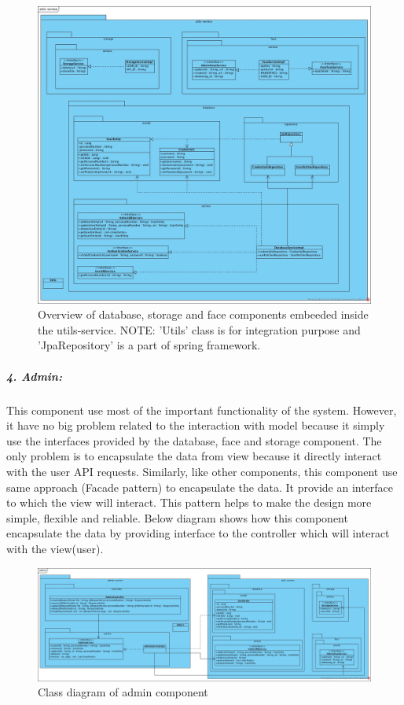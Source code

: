 \documentclass[a4paper,11pt]{article}
\begin{document}
\newpage
\begin{figure}[ht!]
 \centering
    \includegraphics[width=170mm]{ClassDiagrams/new/utils-service.jpg}
    \caption{Overview of database, storage and face components embeeded inside the utils-service.
    \newline
    NOTE: 'Utils' class is for integration purpose and 'JpaRepository' is a part of spring framework.}
\end{figure}

\newpage
\subparagraph{4. Admin: }
This component use most of the important functionality of the system. However, it have no big problem related to the interaction with model because it simply use the interfaces provided by the database, face and storage component. The only problem is to encapsulate the data from view because it directly interact with the user API requests. Similarly, like other components, this component use same approach (Facade pattern) to encapsulate the data. It provide an interface to which the view will interact. This pattern helps to make the design more simple, flexible and reliable. Below diagram shows how this component encapsulate the data by providing interface to the controller which will interact with the view(user).

\begin{figure}[ht!]
    \centering
	\includegraphics[width=150mm]{ClassDiagrams/new/admin.jpg}
	\caption{Class diagram of admin component}
\end{figure}
\end{document}
